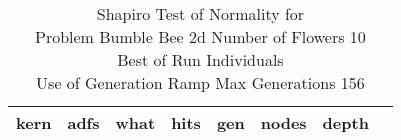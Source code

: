 \begin{table}[H]
\caption{Shapiro Test of Normality for \\ Problem  Bumble Bee 2d  Number of Flowers 10\\Best of Run Individuals \\ Use of Generation Ramp  Max Generations 156\\}
\begin{center}
\scalebox{0.8} %
{
\begin{tabular}{lrrrrrrr}
\hline
kern & adfs & what & hits & gen & nodes & depth \\
\hline


\end{tabular}
}
\end{center}
\end{table}

